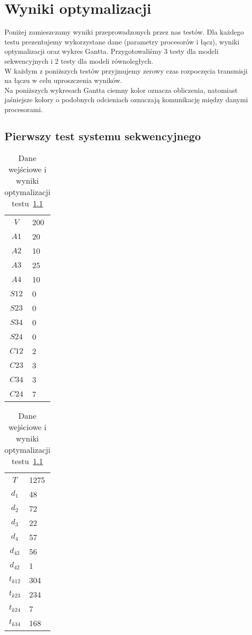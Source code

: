 
\section{Wyniki optymalizacji}

Poniżej zamieszczamy wyniki przeprowadzonych przez nas testów.
Dla każdego testu prezentujemy wykorzystane dane (parametry procesorów i łącz),
wyniki optymalizacji oraz wykres Gantta.
Przygotowaliśmy 3 testy dla modeli sekwencyjnych i 2 testy dla modeli równoległych. \\

W każdym z poniższych testów przyjmujemy zerowy czas rozpoczęcia transmisji na łączu w celu uproszczenia wyników. \\

Na poniższych wykresach Gantta ciemny kolor oznacza obliczenia, natomiast jaśniejsze kolory o podobnych odcieniach oznaczają komunikację między danymi procesorami.

\subsection{Pierwszy test systemu sekwencyjnego} \label{test1}

\begin{table}[H]
\begin{minipage}[b]{0.5\linewidth}
\centering
\begin{tabular}{c l}
$V$ & 200 \\
$A1$ & 20 \\
$A2$ & 10 \\
$A3$ & 25 \\
$A4$ & 10 \\
$S12$ & 0 \\
$S23$ & 0 \\
$S34$ & 0 \\
$S24$ & 0 \\
$C12$ & 2 \\
$C23$ & 3 \\
$C34$ & 3 \\
$C24$ & 7 \\
\end{tabular}
\end{minipage}
\hspace{0.5cm}
\begin{minipage}[b]{0.5\linewidth}
\centering
\begin{tabular}{c l}
$T$ & 1275 \\
$d_{1}$ & 48 \\
$d_{2}$ & 72 \\
$d_{3}$ & 22 \\
$d_{4}$ & 57 \\
$d_{43}$ & 56 \\
$d_{42}$ & 1 \\
$t_{k12}$ & 304 \\
$t_{k23}$ & 234 \\
$t_{k24}$ & 7 \\
$t_{k34}$ & 168 \\
\end{tabular}
\end{minipage}
\caption{Dane wejściowe i wyniki optymalizacji testu~\ref{test1}}
\label{tab:res_1a}
\end{table}

